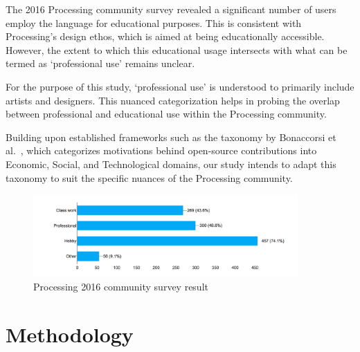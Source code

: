 \documentclass{article}
\begin{document}
The 2016 Processing community survey revealed a significant number of users employ the language for educational purposes. This is consistent with Processing's design ethos, which is aimed at being educationally accessible. However, the extent to which this educational usage intersects with what can be termed as `professional use' remains unclear.

For the purpose of this study, `professional use' is understood to primarily include artists and designers. This nuanced categorization helps in probing the overlap between professional and educational use within the Processing community.

Building upon established frameworks such as the taxonomy by Bonaccorsi et al.~\cite{bonaccorsiComparingMotivationsIndividual2006}, which categorizes motivations behind open-source contributions into Economic, Social, and Technological domains, our study intends to adapt this taxonomy to suit the specific nuances of the Processing community.

\begin{figure}[h!] 
  \centering
  \includegraphics[width=0.9\textwidth]{images/community-survey.png} 
  \caption{Processing 2016 community survey result \parencite{2016CommunitySurvey}}
  \label{fig:community_survey}
\end{figure}




\section{Methodology}
\end{document}
